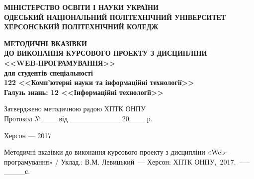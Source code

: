 \begin{titlepage}
\newpage

\begin{center}
\bf
МІНІСТЕРСТВО ОСВІТИ І НАУКИ УКРАЇНИ \\
ОДЕСЬКИЙ НАЦІОНАЛЬНИЙ ПОЛІТЕХНІЧНИЙ УНІВЕРСИТЕТ\\
ХЕРСОНСЬКИЙ ПОЛІТЕХНІЧНИЙ КОЛЕДЖ\\

\end{center}


\vspace{8em}

\begin{center}
\Large\bf 
МЕТОДИЧНІ ВКАЗІВКИ \\
ДО ВИКОНАННЯ КУРСОВОГО ПРОЕКТУ З ДИСЦИПЛІНИ\\
<<WEB-ПРОГРАМУВАННЯ>>\\
\vspace{1em}
для студентів спеціальності \\
122 <<Комп'ютерні науки та інформаційні технології>>\\
Галузь знань: 12  <<Інформаційні технології>>\\

\end{center}
\vspace{5em}

\begin{center}
Затверджено методичною радою ХПТК ОНПУ \\
Протокол №\_\_\_ від \_\_\_\_\_\_\_\_\_\_20\_\_\_ р. \\
\end{center}


\vspace{\fill}

\begin{center}
Херсон --- 2017
\end{center}

\end{titlepage}




\thispagestyle{empty}			
Методичні вказівки до виконання курсового проекту  з дисципліни «Web-програмування» / Уклад.: В.М. Левицький~--– Херсон: ХПТК ОНПУ,~2017.~---– \_\_\_\_с.
\vspace{2em}

